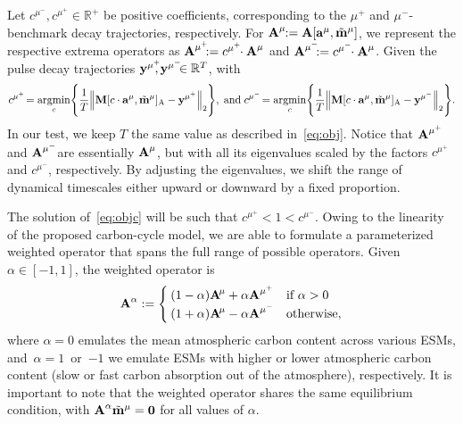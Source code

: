 \documentclass[11pt, a4paper, pdftex, twoside, dvipsnames]{article}
\newcommand{\bb}[1]{\boldsymbol{\bold{#1}}}
\newcommand{\bbt}[1]{\tilde{\boldsymbol{\mathrm{#1}}}}
\newcommand{\argmin}[1]{\underset{#1}{\text{argmin}} }
\begin{document}
Let $c^{\mu^-}\!\!\!, c^{\mu^+}\!\!\! \in \mathbb{R}^+$ be positive coefficients, corresponding to the $\mu^+$ and $\mu^-$-benchmark decay trajectories, respectively.
%
For $\bb{A}^{\mu}\!\!:=\bb{A}[\bb{a}^\mu,\bbt{m}^\mu]$, we represent the respective extrema operators  as $\bb{A}^{\mu^+}\!\!\!:= c^{\mu^+}\!\! \cdot \bb{A}^{\mu}$ and $\bb{A}^{\mu^-}\!\!\!:= c^{\mu^-}\!\! \cdot \bb{A}^{\mu}$.
%
Given the pulse decay trajectories $\bb{y}^{\mu^+}\!\!\!, \bb{y}^{\mu^-}\!\!\!  \in \mathbb{R}^T$,  with
%
\begin{align}\label{eq:objc}
  c^{\mu^+} \!= \argmin{c} \Bigg\{  \frac{1}{T}  \Big \| \bb{M}[c \cdot \bb{a}^\mu, \bbt{m}^{\mu}]_\text{A} - \bb{y}^{\mu^+} \Big \|_2  \Bigg\},\; \text{and} \; 
  c^{\mu^-} \!= \argmin{c} \Bigg\{  \frac{1}{T} \Big \| \bb{M}[c \cdot \bb{a}^\mu, \bbt{m}^{\mu}]_\text{A} - \bb{y}^{\mu^-} \Big \|_2  \Bigg\}.
\end{align}
%
In our test, we keep $T$ the same value as described in~\eqref{eq:obj}.
%
Notice that $\bb{A}^{\mu^+}\!\!$ and $\bb{A}^{\mu^-}\!\!$ are essentially $\bb{A}^{\mu}$, but with all its eigenvalues scaled by the factors $c^{\mu^+}\!\!$ and $c^{\mu^-}\!\!$, respectively.
%
By adjusting the eigenvalues, we shift the range of dynamical timescales either upward or downward by a fixed proportion.


The solution of~\eqref{eq:objc} will be such that $c^{\mu^+} <1<c^{\mu^-}$. 
%
Owing to the linearity of the proposed carbon-cycle model, we are able to formulate a parameterized weighted operator that spans the full range of possible operators.
%
Given $\alpha \in [-1,1]$, the weighted operator is
%
\begin{align}\label{eq:Aalpha}
	\bb{A}^{\alpha} := 
	\begin{cases}
		(1-\alpha)\bb{A}^{\!\mu}  +  \alpha \bb{A}^{\mu^+}   & \text{if $\alpha>0$ } \\
		(1+\alpha)\bb{A}^{\!\mu}  -  \alpha \bb{A}^{\mu^-}   & \text{otherwise},
	\end{cases}
\end{align}
%
where $\alpha=0$ emulates the mean atmospheric carbon content across various ESMs, and~$\alpha=1$~or~$-1$ we emulate ESMs with higher or lower atmospheric carbon content (slow or fast carbon absorption out of the atmosphere), respectively.
%
It is important to note that the weighted operator shares the same equilibrium condition, with $\bb{A}^{\alpha} \bbt{m}^{\mu}=\bb{0}$ for all values of $\alpha$.
%
\end{document}
